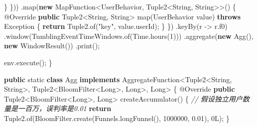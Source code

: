 \documentclass[cn,11pt,chinese]{elegantbook}
\newenvironment{Shaded}{}{}
\newcommand{\AttributeTok}[1]{\textcolor[rgb]{0.49,0.56,0.16}{#1}}
\newcommand{\BaseNTok}[1]{\textcolor[rgb]{0.25,0.63,0.44}{#1}}
\newcommand{\BuiltInTok}[1]{#1}
\newcommand{\CommentTok}[1]{\textcolor[rgb]{0.38,0.63,0.69}{\textit{#1}}}
\newcommand{\DataTypeTok}[1]{\textcolor[rgb]{0.56,0.13,0.00}{#1}}
\newcommand{\DecValTok}[1]{\textcolor[rgb]{0.25,0.63,0.44}{#1}}
\newcommand{\FloatTok}[1]{\textcolor[rgb]{0.25,0.63,0.44}{#1}}
\newcommand{\FunctionTok}[1]{\textcolor[rgb]{0.02,0.16,0.49}{#1}}
\newcommand{\KeywordTok}[1]{\textcolor[rgb]{0.00,0.44,0.13}{\textbf{#1}}}
\newcommand{\NormalTok}[1]{#1}
\newcommand{\StringTok}[1]{\textcolor[rgb]{0.25,0.44,0.63}{#1}}
\begin{document}
\begin{Shaded}
\begin{Highlighting}[]
\NormalTok{                        \}}
\NormalTok{                    \}))}
\NormalTok{            .}\FunctionTok{map}\NormalTok{(}\KeywordTok{new}\NormalTok{ MapFunction\textless{}UserBehavior, Tuple2\textless{}}\BuiltInTok{String}\NormalTok{, }\BuiltInTok{String}\NormalTok{\textgreater{}\textgreater{}() \{}
                \AttributeTok{@Override}
                \KeywordTok{public}\NormalTok{ Tuple2\textless{}}\BuiltInTok{String}\NormalTok{, }\BuiltInTok{String}\NormalTok{\textgreater{} }\FunctionTok{map}\NormalTok{(UserBehavior value) }\KeywordTok{throws} \BuiltInTok{Exception}\NormalTok{ \{}
                    \KeywordTok{return}\NormalTok{ Tuple2.}\FunctionTok{of}\NormalTok{(}\StringTok{"key"}\NormalTok{, value.}\FunctionTok{userId}\NormalTok{);}
\NormalTok{                \}}
\NormalTok{            \})}
\NormalTok{            .}\FunctionTok{keyBy}\NormalTok{(r {-}\textgreater{} r.}\FunctionTok{f0}\NormalTok{)}
\NormalTok{            .}\FunctionTok{window}\NormalTok{(TumblingEventTimeWindows.}\FunctionTok{of}\NormalTok{(}\BuiltInTok{Time}\NormalTok{.}\FunctionTok{hours}\NormalTok{(}\DecValTok{1}\NormalTok{)))}
\NormalTok{            .}\FunctionTok{aggregate}\NormalTok{(}\KeywordTok{new} \FunctionTok{Agg}\NormalTok{(), }\KeywordTok{new} \FunctionTok{WindowResult}\NormalTok{())}
\NormalTok{            .}\FunctionTok{print}\NormalTok{();}

\NormalTok{        env.}\FunctionTok{execute}\NormalTok{();}
\NormalTok{    \}}

    \KeywordTok{public} \DataTypeTok{static} \KeywordTok{class}\NormalTok{ Agg }\KeywordTok{implements}\NormalTok{ AggregateFunction\textless{}Tuple2\textless{}}\BuiltInTok{String}\NormalTok{, }\BuiltInTok{String}\NormalTok{\textgreater{}, Tuple2\textless{}BloomFilter\textless{}}\BuiltInTok{Long}\NormalTok{\textgreater{}, }\BuiltInTok{Long}\NormalTok{\textgreater{}, }\BuiltInTok{Long}\NormalTok{\textgreater{} \{}
        \AttributeTok{@Override}
        \KeywordTok{public}\NormalTok{ Tuple2\textless{}BloomFilter\textless{}}\BuiltInTok{Long}\NormalTok{\textgreater{}, }\BuiltInTok{Long}\NormalTok{\textgreater{} }\FunctionTok{createAccumulator}\NormalTok{() \{}
            \CommentTok{// 假设独立用户数量是一百万，误判率是0.01}
            \KeywordTok{return}\NormalTok{ Tuple2.}\FunctionTok{of}\NormalTok{(BloomFilter.}\FunctionTok{create}\NormalTok{(Funnels.}\FunctionTok{longFunnel}\NormalTok{(), }\DecValTok{1000000}\NormalTok{, }\FloatTok{0.}\BaseNTok{01}\NormalTok{), }\DecValTok{0L}\NormalTok{);}
\NormalTok{        \}}


\end{Highlighting}
\end{Shaded}
\end{document}
